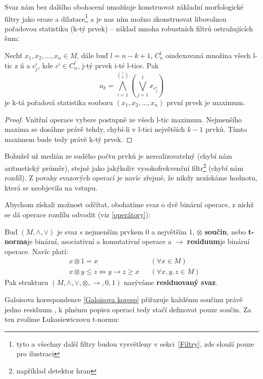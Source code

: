     Svaz nám bez dalšího obohacení umožňuje konstruovat základní morfologické filtry jako eroze a dilatace\footnote{tyto a všechny další filtry budou vysvětleny v sekci~\ref{Filtry}, zde slouží pouze pro ilustraci} a je nas ním možno zkonstruovat libovolnou pořadovou statistiku (k-tý prvek) -- základ mnoha robustních filtrů ostraňujících šum:

    \begin{theo}\label{theo k-tý prvek}
      Nechť $x_1,x_2,...,x_n \in M$, dále buď $l = n-k+1$, $C^{l}_n$ oindexovaná množina všech l-tic z \^n a $c^i_j$, kde $c^i \in C^{l}_n$, j-tý prvek i-té l-tice. Pak
      \[
        a_k = \bigwedge_{i = 1}^{{l}\choose{n}}\left( \bigvee_{j = 1}^{l} x_{c_{j}^i} \right)
      \]
      je k-tá pořadová statistika souboru $(x_1,x_2,...,x_n)$ \rl první prvek je maximum\rr.
    \end{theo}
    \begin{proof}
      Vnitřní operace vybere postupně ze všech l-tic maximum. Nejmenšího maxima se dosáhne právě tehdy, chybí-li v l-tici největších $k-1$ prvků. Tímto maximem bude tedy právě k-tý prvek.
    \end{proof}

    Bohužel už medián ze sudého počtu prvků je nerealizovatelný (chybí nám aritmetický průměr), stejně jako jakýkoliv vysokofrekvenční filtr\footnote{například detektor hran} (chybí nám rozdíl). Z povahy svazových operací je navíc zřejmé, že nikdy nezískáme hodnotu, která se neobjevila na vstupu.

    Abychom získali možnost odčítat, obohatíme svaz o dvě binární operace, z nichž se dá operace rozdílu odvodit (viz \ref{operátory}):

    \begin{define}\label{def residuovaný svaz}
    Buď $(M,\wedge,\vee)$ je svaz s nejmenším prvkem 0 a největším 1, $\otimes$ \rl \textbf{součin}, nebo \textbf{t-norma}\rr je binární, asociativní a komutativní operace a $\rightarrow$ \rl \textbf{residuum}\rr je binární operace. Navíc platí:
    \begin{align}
    &x \otimes 1 = x  &&(\forall x \in M)\\
    &x \otimes y \leq z \Leftrightarrow y \rightarrow z \geq x &&(\forall x,y,z \in M)\label{Galoisova koresp}
    \end{align}
    Pak strukturu $(M,\wedge,\vee,\otimes,\rightarrow,0,1)$ nazýváme \textbf{residuovaný svaz}.
    \end{define}

    Galoisova korespondence \eqref{Galoisova koresp} přiřazuje každému součinu právě jedno residuum , k plnému popisu operací tedy stačí definovat pouze součin. Za ten zvolíme \L ukasiewiczovu t-normu:

